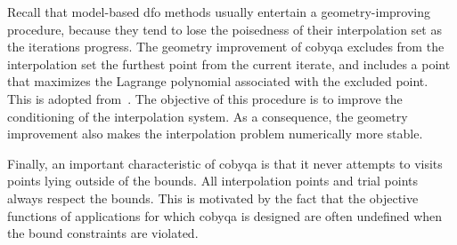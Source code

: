 Recall that model-based \gls{dfo} methods usually entertain a geometry-improving procedure, because they tend to lose the poisedness of their interpolation set as the iterations progress.
The geometry improvement of \gls{cobyqa} excludes from the interpolation set the furthest point from the current iterate, and includes a point that maximizes the Lagrange polynomial associated with the excluded point.
This is adopted from~\cite{Powell_2006,Powell_2009}.
The objective of this procedure is to improve the conditioning of the interpolation system.
As a consequence, the geometry improvement also makes the interpolation problem numerically more stable.

Finally, an important characteristic of \gls{cobyqa} is that it never attempts to visits points lying outside of the bounds.
All interpolation points and trial points always respect the bounds.
This is motivated by the fact that the objective functions of applications for which \gls{cobyqa} is designed are often undefined when the bound constraints are violated.
